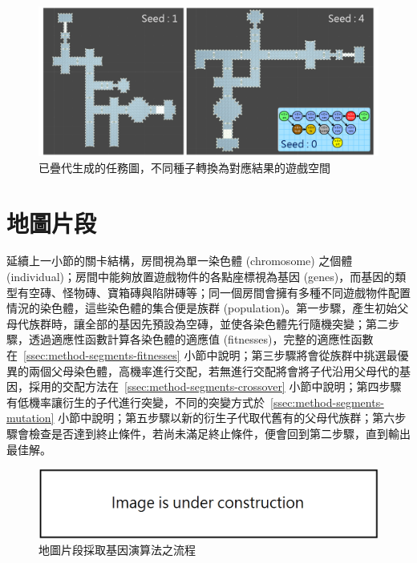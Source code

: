 \begin{figure}[ht]
  \begin{center}
    \includegraphics[width=1.0\textwidth]{figures/mission-to-space-result.png}
    \caption{已疊代生成的任務圖，不同種子轉換為對應結果的遊戲空間} 
    \label{fig:mission-to-space-result}
  \end{center}
\end{figure}

\clearpage

\section{地圖片段}
\label{sec:method-segments}

延續上一小節的關卡結構，房間視為單一染色體 (chromosome) 之個體 (individual)；房間中能夠放置遊戲物件的各點座標視為基因 (genes)，而基因的類型有空磚、怪物磚、寶箱磚與陷阱磚等；同一個房間會擁有多種不同遊戲物件配置情況的染色體，這些染色體的集合便是族群 (population)。第一步驟，產生初始父母代族群時，讓全部的基因先預設為空磚，並使各染色體先行隨機突變；第二步驟，透過適應性函數計算各染色體的適應值 (fitnesses)，完整的適應性函數在~\ref{ssec:method-segments-fitnesses} 小節中說明；第三步驟將會從族群中挑選最優異的兩個父母染色體，高機率進行交配，若無進行交配將會將子代沿用父母代的基因，採用的交配方法在~\ref{ssec:method-segments-crossover} 小節中說明；第四步驟有低機率讓衍生的子代進行突變，不同的突變方式於~\ref{ssec:method-segments-mutation} 小節中說明；第五步驟以新的衍生子代取代舊有的父母代族群；第六步驟會檢查是否達到終止條件，若尚未滿足終止條件，便會回到第二步驟，直到輸出最佳解。

\begin{figure}[ht]
  \begin{center}
    \includegraphics[width=1.0\textwidth]{figures/under_construction.png}
    \caption{地圖片段採取基因演算法之流程} 
    \label{fig:segments-with-ga}
  \end{center}
\end{figure}

